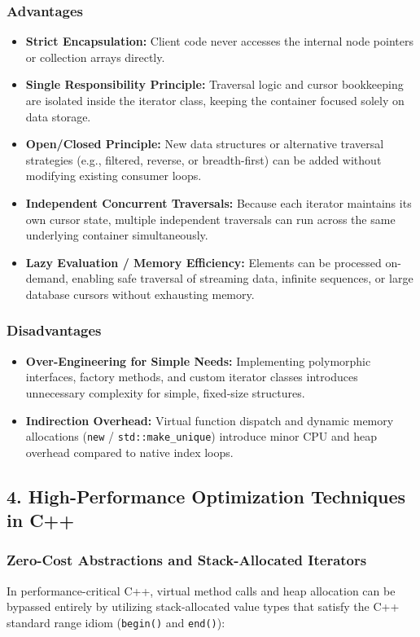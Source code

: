 \subsubsection{Advantages}
\begin{itemize}
    \item \textbf{Strict Encapsulation:} Client code never accesses the internal node pointers or collection arrays directly.
    \item \textbf{Single Responsibility Principle:} Traversal logic and cursor bookkeeping are isolated inside the iterator class, keeping the container focused solely on data storage.
    \item \textbf{Open/Closed Principle:} New data structures or alternative traversal strategies (e.g., filtered, reverse, or breadth-first) can be added without modifying existing consumer loops.
    \item \textbf{Independent Concurrent Traversals:} Because each iterator maintains its own cursor state, multiple independent traversals can run across the same underlying container simultaneously.
    \item \textbf{Lazy Evaluation / Memory Efficiency:} Elements can be processed on-demand, enabling safe traversal of streaming data, infinite sequences, or large database cursors without exhausting memory.
\end{itemize}

\subsubsection{Disadvantages}
\begin{itemize}
    \item \textbf{Over-Engineering for Simple Needs:} Implementing polymorphic interfaces, factory methods, and custom iterator classes introduces unnecessary complexity for simple, fixed-size structures.
    \item \textbf{Indirection Overhead:} Virtual function dispatch and dynamic memory allocations (\texttt{new} / \texttt{std::make\_unique}) introduce minor CPU and heap overhead compared to native index loops.
\end{itemize}

\subsection{4. High-Performance Optimization Techniques in C++}

\subsubsection{Zero-Cost Abstractions and Stack-Allocated Iterators}
In performance-critical C++, virtual method calls and heap allocation can be bypassed entirely by utilizing stack-allocated value types that satisfy the C++ standard range idiom (\texttt{begin()} and \texttt{end()}):

